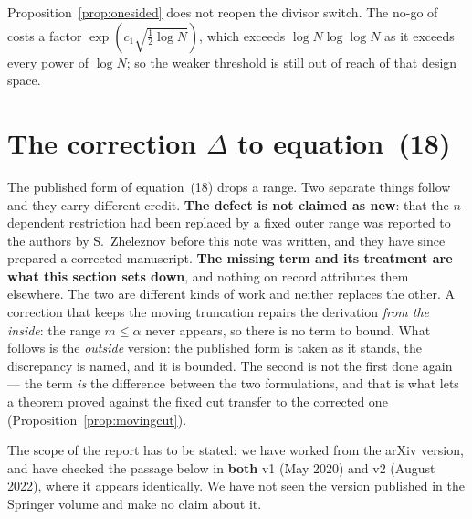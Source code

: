 \documentclass[11pt,a4paper]{article}
\theoremstyle{plain}
\theoremstyle{definition}
\theoremstyle{remark}
\begin{document}
Proposition~\ref{prop:onesided} does not reopen the divisor switch.
The no-go of \cite{P2} costs a factor
$\exp(c_1\sqrt{\tfrac12\log N})$, which exceeds $\log N\log\log N$ as
it exceeds every power of $\log N$; so the weaker threshold is still
out of reach of that design space.

\section{The correction \texorpdfstring{$\Delta$}{Delta} to
equation~(18)}\label{sec:delta}

The published form of equation~(18) drops a range. Two separate things
follow and they carry different credit. \textbf{The defect is not
claimed as new}: that the $n$-dependent restriction had been replaced
by a fixed outer range was reported to the authors by S.~Zheleznov
before this note was written, and they have since prepared a corrected
manuscript. \textbf{The missing term and its treatment are what this
section sets down}, and nothing on record attributes them elsewhere.
The two are different kinds of work and neither replaces the other. A
correction that keeps the moving truncation repairs the derivation
\emph{from the inside}: the range $m\le\alpha$ never appears, so there
is no term to bound. What follows is the \emph{outside} version: the
published form is taken as it stands, the discrepancy is named, and it
is bounded. The second is not the first done again --- the term
\emph{is} the difference between the two formulations, and that is what
lets a theorem proved against the fixed cut transfer to the corrected
one (Proposition~\ref{prop:movingcut}).

The scope of the report has to be stated: we have worked from the arXiv
version, and have checked the passage below in \textbf{both} v1 (May
2020) and v2 (August 2022), where it appears identically. We have not
seen the version published in the Springer volume and make no claim
about it.
\end{document}
